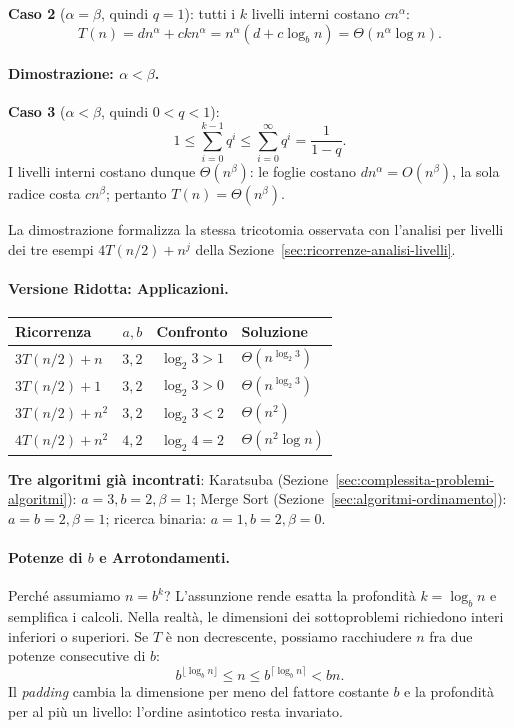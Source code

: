 \documentclass[12pt, a4paper]{article}
\begin{document}
\textbf{Caso 2} ($\alpha=\beta$, quindi $q=1$): tutti i $k$ livelli interni costano $cn^\alpha$:
$$T(n) = dn^\alpha + ckn^\alpha = n^\alpha(d+c\log_b n) = \Theta(n^\alpha\log n).$$

\paragraph{Dimostrazione: $\alpha<\beta$.}
\textbf{Caso 3} ($\alpha<\beta$, quindi $0<q<1$):
$$1 \le \sum_{i=0}^{k-1}q^i \le \sum_{i=0}^{\infty}q^i = \frac{1}{1-q}.$$
I livelli interni costano dunque $\Theta(n^\beta)$: le foglie costano $dn^\alpha=O(n^\beta)$, la sola radice costa $cn^\beta$; pertanto $T(n)=\Theta(n^\beta)$.

\begin{tcolorbox}[colback=lightergray!5, colframe=tocsubsec, title=\textbf{Nota}]
La dimostrazione formalizza la stessa tricotomia osservata con l'analisi per livelli dei tre esempi $4T(n/2)+n^j$ della Sezione~\ref{sec:ricorrenze-analisi-livelli}.
\end{tcolorbox}

\paragraph{Versione Ridotta: Applicazioni.}
\begin{center}
\begin{tabular}{lccl}
\toprule
\textbf{Ricorrenza} & $a,b$ & \textbf{Confronto} & \textbf{Soluzione} \\
\midrule
$3T(n/2)+n$ & $3,2$ & $\log_2 3 > 1$ & $\Theta(n^{\log_2 3})$ \\
$3T(n/2)+1$ & $3,2$ & $\log_2 3 > 0$ & $\Theta(n^{\log_2 3})$ \\
$3T(n/2)+n^2$ & $3,2$ & $\log_2 3 < 2$ & $\Theta(n^2)$ \\
$4T(n/2)+n^2$ & $4,2$ & $\log_2 4 = 2$ & $\Theta(n^2\log n)$ \\
\bottomrule
\end{tabular}
\end{center}
\textbf{Tre algoritmi già incontrati}: Karatsuba (Sezione~\ref{sec:complessita-problemi-algoritmi}): $a=3,b=2,\beta=1$; Merge Sort (Sezione~\ref{sec:algoritmi-ordinamento}): $a=b=2,\beta=1$; ricerca binaria: $a=1,b=2,\beta=0$.

\paragraph{Potenze di $b$ e Arrotondamenti.}
Perché assumiamo $n=b^k$? L'assunzione rende esatta la profondità $k=\log_b n$ e semplifica i calcoli. Nella realtà, le dimensioni dei sottoproblemi richiedono interi inferiori o superiori. Se $T$ è non decrescente, possiamo racchiudere $n$ fra due potenze consecutive di $b$:
$$b^{\lfloor \log_b n\rfloor} \le n \le b^{\lceil \log_b n\rceil} < bn.$$
Il \textit{padding} cambia la dimensione per meno del fattore costante $b$ e la profondità per al più un livello: l'ordine asintotico resta invariato.
\end{document}
